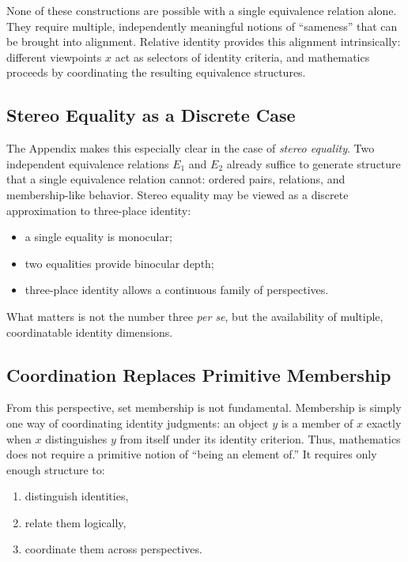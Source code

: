 \documentclass{ws-rv9x6}
\theoremstyle{remark}
\begin{document}
None of these constructions are possible with a single equivalence relation alone. They require multiple, independently meaningful notions of ``sameness'' that can be brought into alignment. Relative identity provides this alignment intrinsically: different viewpoints $x$ act as selectors of identity criteria, and mathematics proceeds by coordinating the resulting equivalence structures.

\subsection{Stereo Equality as a Discrete Case}

The Appendix makes this especially clear in the case of \emph{stereo equality}. Two independent equivalence relations $E_1$ and $E_2$ already suffice to generate structure that a single equivalence relation cannot: ordered pairs, relations, and membership-like behavior. Stereo equality may be viewed as a discrete approximation to three-place identity:
\begin{itemize}
    \item a single equality is monocular;
    \item two equalities provide binocular depth;
    \item three-place identity allows a continuous family of perspectives.
\end{itemize}

What matters is not the number three \emph{per se}, but the availability of multiple, coordinatable identity dimensions.

\subsection{Coordination Replaces Primitive Membership}

From this perspective, set membership is not fundamental. Membership is simply one way of coordinating identity judgments: an object $y$ is a member of $x$ exactly when $x$ distinguishes $y$ from itself under its identity criterion. Thus, mathematics does not require a primitive notion of ``being an element of.'' It requires only enough structure to:
\begin{enumerate}
    \item distinguish identities,
    \item relate them logically,
    \item coordinate them across perspectives.
\end{enumerate}
\end{document}
